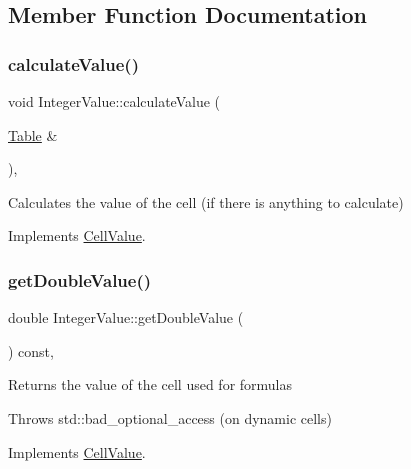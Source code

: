 \subsection{Member Function Documentation}
\mbox{\label{classIntegerValue_a00b35d20cf466e13c83feda8d782d0a4}} 
\subsubsection{\texorpdfstring{calculate\+Value()}{calculateValue()}}
{\footnotesize\ttfamily void Integer\+Value\+::calculate\+Value (\begin{DoxyParamCaption}\item[{\hyperlink{classTable}{Table} \&}]{ }\end{DoxyParamCaption})\hspace{0.3cm}{\ttfamily [override]}, {\ttfamily [virtual]}}

Calculates the value of the cell (if there is anything to calculate) 

Implements \hyperlink{classCellValue_ab644256decf3608ed50e389ead6cf611}{Cell\+Value}.

\mbox{\label{classIntegerValue_aafc02b663f92364a94ce69b796301730}} 
\subsubsection{\texorpdfstring{get\+Double\+Value()}{getDoubleValue()}}
{\footnotesize\ttfamily double Integer\+Value\+::get\+Double\+Value (\begin{DoxyParamCaption}{ }\end{DoxyParamCaption}) const\hspace{0.3cm}{\ttfamily [override]}, {\ttfamily [virtual]}}

Returns the value of the cell used for formulas

Throws std\+::bad\+\_\+optional\+\_\+access (on dynamic cells) 

Implements \hyperlink{classCellValue_a3d2850b3a8473050fd46f486a29ed5bf}{Cell\+Value}.

\mbox{\label{classIntegerValue_ac16c4b202cc48d96e9b1aa0137be7239}} 
